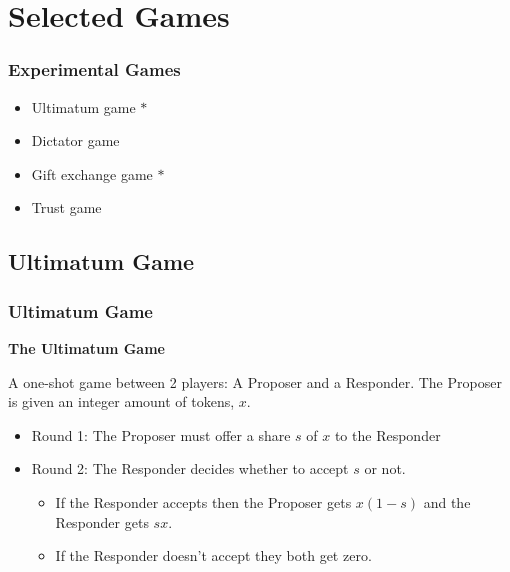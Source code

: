 \documentclass{beamer}
\begin{document}
\section{Selected Games}


\begin{frame}
	\frametitle{Experimental Games}
	\begin{itemize}
		\item Ultimatum game $\ast$ 
		\item Dictator game
		\item Gift exchange game	$\ast$ 	
		\item Trust game
	\end{itemize}
\end{frame}

\subsection{Ultimatum Game}


\begin{frame}
	\frametitle{Ultimatum Game}
	\textbf{The Ultimatum Game}
	
	A one-shot game between 2 players: A Proposer and a Responder. The Proposer is given an integer amount of tokens, $x$.
	
	\begin{itemize}
		\item Round 1: The Proposer must offer a share $s$ of $x$ to the Responder
		\item Round 2: The Responder decides whether to accept $s$ or not. 
		\begin{itemize}
			\item If the Responder accepts then the Proposer gets $x \left(1 - s\right)$ and the Responder gets $sx$.
			\item If the Responder doesn't accept they both get zero.
		\end{itemize}
	\end{itemize}
	
\end{frame}
\end{document}
